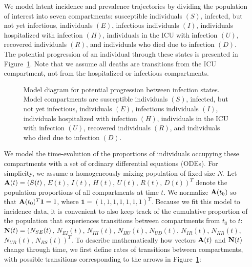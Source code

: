 We model latent incidence and prevalence trajectories by dividing the population of interest into seven compartments: susceptible individuals \( (S) \), infected, but not yet infectious, individuals \( (E) \), infectious individuals \( (I) \), individuals hospitalized with infection \( (H) \), individuals in the ICU with infection \( (U) \),  recovered individuals \( (R) \), and individuals who died due to infection \( (D) \).
The potential progression of an individual through these states is presented in Figure~\ref{ch_5:fig:model_diagram}.
Note that we assume all deaths are transitions from the ICU compartment, not from the hospitalized or infectious compartments.
\begin{figure}
    \centering
    \caption[State transition diagram.]{Model diagram for potential progression between infection states.
    Model compartments are susceptible individuals \( (S) \), infected, but not yet infectious, individuals \( (E) \), infectious individuals \( (I) \), individuals hospitalized with infection \( (H) \), individuals in the ICU with infection \( (U) \),  recovered individuals \( (R) \), and individuals who died due to infection \( (D) \).}
    \label{ch_5:fig:model_diagram}
\end{figure}
We model the time-evolution of the proportions of individuals occupying these compartments with a set of ordinary differential equations (ODEs).
For simplicity, we assume a homogeneously mixing population of fixed size \( N \).
Let \( \mathbf{A}(t) = \left(S(t) \right.\), \( E(t) \), \( I(t) \), \( H(t) \), \( U(t) \), \( R(t) \), \( \left. D(t) \right)^T \) denote the population proportions of all compartments at time \( t \).
We normalize \( \mathbf{A}(t_0) \) so that \( \mathbf{A}(t_0)^T\boldsymbol{1} = 1\), where \( \boldsymbol{1} = (1, 1, 1, 1, 1, 1, 1)^T \).
Because we fit this model to incidence data, it is convenient to also keep track of the cumulative proportion of the population that experiences transitions between compartments from \( t_0 \) to \( t \): \( \mathbf{N}(t) = \left(N_{SE}(t) \right. \), \( N_{EI}(t) \), \( N_{IH}(t) \), \( N_{HU}(t) \), \( N_{UD}(t) \), \( N_{IR}(t) \), \( N_{HR}(t) \), \( N_{UR}(t) \), \( \left. N_{RS}(t) \right)^T\).
To describe mathematically how vectors $\mathbf{A}(t)$ and $\mathbf{N}(t)$ change through time, we first define rates of transitions between compartments, with possible transitions corresponding to the arrows in Figure~\ref{ch_5:fig:model_diagram}:

